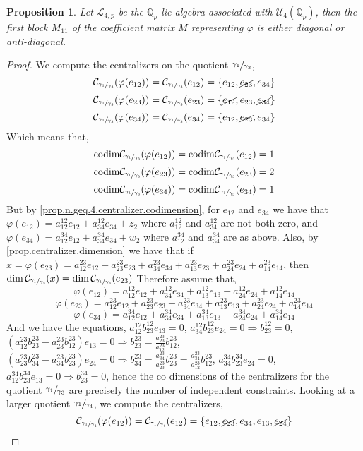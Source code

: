 \documentclass[12pt,fleqn]{article}
\newtheorem{proposition}[theorem]{Proposition}
\begin{document}
\begin{proposition}
Let $\mathcal{L}_{4,p}$ be the $\mathbb{Q}_p$-lie algebra associated with $\mathcal{U}_4(\mathbb{Q}_p)$, then the first block $M_{11}$ of the coefficient matrix $M$ representing $\varphi$ is either diagonal or anti-diagonal.
\end{proposition}
\begin{proof}
We compute the centralizers on the quotient $\sfrac{\gamma_1}{\gamma_3}$,
\[\mathcal{C}_{\sfrac{\gamma_1}{\gamma_3}}(\varphi(e_{12}))=\mathcal{C}_{\sfrac{\gamma_1}{\gamma_3}}(e_{12})=\{e_{12},\cancel{e_{23}},e_{34}\}\]
\[\mathcal{C}_{\sfrac{\gamma_1}{\gamma_3}}(\varphi(e_{23}))=\mathcal{C}_{\sfrac{\gamma_1}{\gamma_3}}(e_{23})=\{\cancel{e_{12}},e_{23},\cancel{e_{34}}\}\]
\[\mathcal{C}_{\sfrac{\gamma_1}{\gamma_3}}(\varphi(e_{34}))=\mathcal{C}_{\sfrac{\gamma_1}{\gamma_3}}(e_{34})=\{e_{12},\cancel{e_{23}},e_{34}\}\]
Which means that,
\[\mathrm{codim}\mathcal{C}_{\sfrac{\gamma_1}{\gamma_3}}(\varphi(e_{12}))=\mathrm{codim}\mathcal{C}_{\sfrac{\gamma_1}{\gamma_3}}(e_{12})=1\]
\[\mathrm{codim}\mathcal{C}_{\sfrac{\gamma_1}{\gamma_3}}(\varphi(e_{23}))=\mathrm{codim}\mathcal{C}_{\sfrac{\gamma_1}{\gamma_3}}(e_{23})=2\]
\[\mathrm{codim}\mathcal{C}_{\sfrac{\gamma_1}{\gamma_3}}(\varphi(e_{34}))=\mathrm{codim}\mathcal{C}_{\sfrac{\gamma_1}{\gamma_3}}(e_{34})=1\]
But by \ref{prop.n.geq.4.centralizer.codimension}, for $e_{12}$ and $e_{34}$ we have that $\varphi(e_{12})=a_{12}^{12}e_{12}+a_{34}^{12}e_{34}+z_2$ where $a_{12}^{12}$ and $a_{34}^{12}$ are not both zero, and $\varphi(e_{34})=a_{12}^{34}e_{12}+a_{34}^{34}e_{34}+w_2$ where $a_{12}^{34}$ and $a_{34}^{34}$ are as above. Also, by \ref{prop.centralizer.dimension} we have that if $x=\varphi(e_{23})=a_{12}^{23}e_{12}+a_{23}^{23}e_{23}+a_{34}^{23}e_{34}+a_{13}^{23}e_{23}+a_{24}^{23}e_{24}+a_{14}^{23}e_{14}$, then $\dim\mathcal{C}_{\sfrac{\gamma_1}{\gamma_3}}(x)=\dim\mathcal{C}_{\sfrac{\gamma_1}{\gamma_3}}(e_{23})$ Therefore assume that,
\[\varphi(e_{12})= a_{12}^{12}e_{12}+a_{34}^{12}e_{34}+a_{13}^{12}e_{13}+a_{24}^{12}e_{24}+a_{14}^{12}e_{14}\]
\[\varphi(e_{23})= a_{12}^{23}e_{12}+a_{23}^{23}e_{23}+a_{34}^{23}e_{34}+a_{13}^{23}e_{13}+a_{24}^{23}e_{24}+a_{14}^{23}e_{14}\]
\[\varphi(e_{34})= a_{12}^{34}e_{12}+a_{34}^{34}e_{34}+a_{13}^{34}e_{13}+a_{24}^{34}e_{24}+a_{14}^{34}e_{14}\]
And we have the equations,
$a_{12}^{12}b_{23}^{12}e_{13}=0$, $a_{34}^{12}b_{23}^{12}e_{24}=0\Rightarrow b_{23}^{12}=0$, $(a_{12}^{23}b_{23}^{23}-a_{23}^{23}b_{12}^{23})e_{13}=0\Rightarrow b_{23}^{23}=\frac{a_{23}^{23}}{a_{12}^{23}}b_{12}^{23}$, $(a_{23}^{23}b_{34}^{23}-a_{34}^{23}b_{23}^{23})e_{24}=0\Rightarrow b_{34}^{23}=\frac{a_{34}^{23}}{a_{23}^{23}}b_{23}^{23}=\frac{a_{34}^{23}}{a_{12}^{23}}b_{12}^{23}$, $a_{34}^{34}b_{23}^{34}e_{24}=0$, $a_{12}^{34}b_{23}^{34}e_{13}=0\Rightarrow b_{23}^{34}=0$, hence the co dimensions of the centralizers for the quotient $\sfrac{\gamma_1}{\gamma_3}$ are precisely the number of independent constraints. Looking at a larger quotient $\sfrac{\gamma_1}{\gamma_4}$, we compute the centralizers, \[\mathcal{C}_{\sfrac{\gamma_1}{\gamma_4}}(\varphi(e_{12}))=\mathcal{C}_{\sfrac{\gamma_1}{\gamma_4}}(e_{12})=\{e_{12},\cancel{e_{23}},e_{34},e_{13},\cancel{e_{24}}\}\]

\end{proof}
\end{document}
